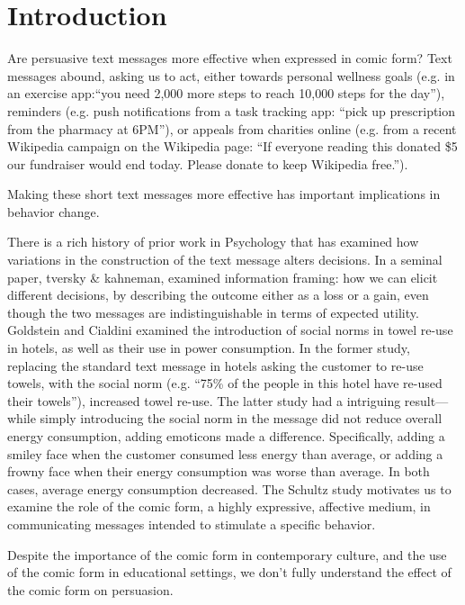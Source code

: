 
\section{Introduction}
\label{sec:Introduction}
Are persuasive text messages more effective when expressed in comic form? Text messages abound, asking us to act, either towards personal wellness goals (e.g. in an exercise app:``you need 2,000 more steps to reach 10,000 steps for the day''), reminders (e.g. push notifications from a task tracking app: ``pick up prescription from the pharmacy at 6PM''), or appeals from charities online (e.g. from a recent Wikipedia campaign on the Wikipedia page: ``If everyone reading this donated \$5 our fundraiser would end today. Please donate to keep Wikipedia free.''). 

Making these short text messages more effective has important implications in behavior change.

There is a rich history of prior work in Psychology that has examined how variations in the construction of the text message alters decisions. In a seminal paper, tversky & kahneman, examined information framing: how we can elicit different decisions, by describing the outcome either as a loss or a gain, even though the two messages are indistinguishable in terms of expected utility. Goldstein and Cialdini examined the introduction of social norms in towel re-use in hotels, as well as their use in power consumption. In the former study, replacing the standard text message in hotels asking the customer to re-use towels, with the social norm (e.g. ``75\% of the people in this hotel have re-used their towels''), increased towel re-use. The latter study had a intriguing result---while simply introducing the social norm in the message did not reduce overall energy consumption, adding emoticons made a difference. Specifically, adding a smiley face when the customer consumed less energy than average, or adding a frowny face when their energy consumption was worse than average. In both cases, average energy consumption decreased. The Schultz study motivates us to examine the role of the comic form, a highly expressive, affective medium, in communicating messages intended to stimulate a specific behavior.

Despite the importance of the comic form in contemporary culture, and the use of the comic form in educational settings, we don't fully understand the effect of the comic form on persuasion. 

